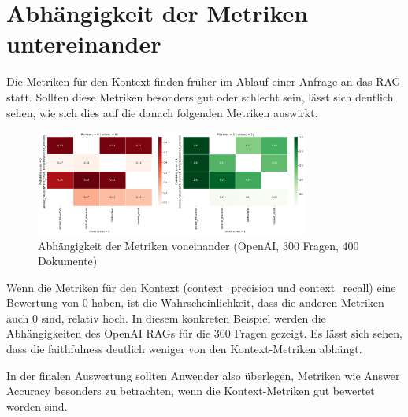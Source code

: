 \section{Abhängigkeit der Metriken untereinander}
Die Metriken für den Kontext finden früher im Ablauf einer Anfrage an das RAG statt. Sollten diese Metriken besonders gut oder schlecht sein, lässt sich deutlich sehen, wie sich dies auf die danach folgenden Metriken auswirkt.

\begin{figure}[htbp]
    \centering
    \includegraphics[width=0.8\textwidth]{images/metric_influence_400_300_O_O.png}
    \caption{Abhängigkeit der Metriken voneinander (OpenAI, 300 Fragen, 400 Dokumente)}
    \label{fig:metric_influence}
\end{figure}

Wenn die Metriken für den Kontext (context\_precision und context\_recall) eine Bewertung von 0 haben, ist die Wahrscheinlichkeit, dass die anderen Metriken auch 0 sind, relativ hoch.
In diesem konkreten Beispiel werden die Abhängigkeiten des OpenAI RAGs für die 300 Fragen gezeigt. Es lässt sich sehen, dass die faithfulness deutlich weniger von den Kontext-Metriken abhängt.

In der finalen Auswertung sollten Anwender also überlegen, Metriken wie Answer Accuracy besonders zu betrachten, wenn die Kontext-Metriken gut bewertet worden sind.